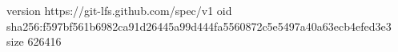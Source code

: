 version https://git-lfs.github.com/spec/v1
oid sha256:f597bf561b6982ca91d26445a99d444fa5560872c5e5497a40a63ecb4efed3e3
size 626416
